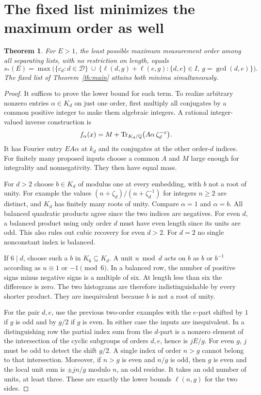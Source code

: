 \documentclass[11pt,letterpaper]{article}
\newtheorem{theorem}{Theorem}\newtheorem{lemma}[theorem]{Lemma}\newtheorem{corollary}[theorem]{Corollary}\newtheorem{proposition}[theorem]{Proposition}
\newcommand{\D}{\mathcal D}\newcommand{\U}{\mathcal U}
\begin{document}
\section{The fixed list minimizes the maximum order as well}
\begin{theorem}\label{th:degree}
For $E>1$, the least possible maximum measurement order among all separating lists, with no restriction on length, equals
\[
 s_*(E)=\max\bigl(\{c_d:d\in\D\}\ \cup\
   \{\ell(d,g)+\ell(e,g):\{d,e\}\in I,\ g=\gcd(d,e)\}\bigr).
\]
The fixed list of Theorem~\ref{th:main} attains both minima simultaneously.
\end{theorem}
\begin{proof}
It suffices to prove the lower bound for each term. To realize arbitrary nonzero entries $\alpha\in K_d$ on just one order, first multiply all conjugates by a common positive integer to make them algebraic integers. A rational integer-valued inverse construction is
\[
 f_\alpha(x)=M+\operatorname{Tr}_{K_d/\mathbb Q}\bigl(A\alpha\,\zeta_d^{-x}\bigr).
\]
It has Fourier entry $EA\alpha$ at $k_d$ and its conjugates at the other order-$d$ indices. For finitely many proposed inputs choose a common $A$ and $M$ large enough for integrality and nonnegativity. They then have equal mass.

For $d>2$ choose $b\in K_d$ of modulus one at every embedding, with $b$ not a root of unity. For example the values $(n+\zeta_d)/(n+\zeta_d^{-1})$ for integers $n\ge2$ are distinct, and $K_d$ has finitely many roots of unity. Compare $\alpha=1$ and $\alpha=b$. All balanced quadratic products agree since the two indices are negatives. For even $d$, a balanced product using only order $d$ must have even length since its units are odd. This also rules out cubic recovery for even $d>2$. For $d=2$ no single nonconstant index is balanced.

If $6\mid d$, choose such a $b$ in $K_6\subseteq K_d$. A unit $u\bmod d$ acts on $b$ as $b$ or $b^{-1}$ according as $u\equiv 1$ or $-1\pmod6$. In a balanced row, the number of positive signs minus negative signs is a multiple of six. At length less than six the difference is zero. The two histograms are therefore indistinguishable by every shorter product. They are inequivalent because $b$ is not a root of unity.

For the pair $d,e$, use the previous two-order examples with the $e$-part shifted by $1$ if $g$ is odd and by $g/2$ if $g$ is even. In either case the inputs are inequivalent. In a distinguishing row the partial index sum from the $d$-part is a nonzero element of the intersection of the cyclic subgroups of orders $d,e$, hence is $jE/g$. For even $g$, $j$ must be odd to detect the shift $g/2$. A single index of order $n>g$ cannot belong to that intersection. Moreover, if $n>g$ is even and $n/g$ is odd, then $g$ is even and the local unit sum is $\pm jn/g$ modulo $n$, an odd residue. It takes an odd number of units, at least three. These are exactly the lower bounds $\ell(n,g)$ for the two sides.
\end{proof}
\end{document}
